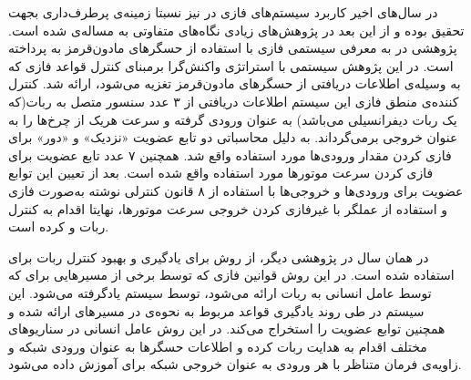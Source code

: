 در سال‌های اخیر کاربرد سیستم‌های فازی در  نیز نسبتا زمینه‌ی پرطرف‌داری بجهت تحقیق بوده و از این بعد در پژوهش‌های زیادی نگاه‌های متفاوتی به مساله‌ی  شده است. پژوهشی در  به معرفی سیستمی فازی با استفاده از حسگرهای مادون‌قرمز به  پرداخته است. در این پژوهش سیستمی با استراتژی واکنش‌گرا برمبنای کنترل قواعد فازی که به وسیله‌ی اطلاعات دریافتی از حسگرهای مادون‌قرمز تغزیه می‌شود، ارائه شد. کنترل کننده‌ی منطق فازی این سیستم اطلاعات دریافتی از ۳ عدد سنسور متصل به ربات(که یک ربات دیفرانسیلی می‌باشد) به عنوان ورودی گرفته و سرعت هریک از چرخ‌ها را به عنوان خروجی برمی‌گرداند. به دلیل محاسباتی دو تابع عضویت «نزدیک» و «دور» برای فازی کردن مقدار ورودی‌ها مورد استفاده واقع شد. همچنین ۷ عدد تابع عضویت برای فازی کردن سرعت موتورها مورد استفاده واقع شده است. بعد از تعیین این توابع عضویت برای ورودی‌ها و خروجی‌ها با استفاده از ۸ قانون کنترلی نوشته به‌صورت فازی و استفاده از عملگر  با غیرفازی کردن خروجی سرعت موتورها، نهایتا اقدام به کنترل ربات و  کرده است.

در همان سال در پژوهشی دیگر، از روش  برای یادگیری و بهبود کنترل ربات برای  استفاده شده است. در این روش قوانین فازی که توسط برخی از مسیرهایی برای  که توسط عامل انسانی به ربات ارائه می‌شود، توسط سیستم  یادگرفته می‌شود. این سیستم در طی روند یادگیری قواعد مربوط به نحوه‌ی  در مسیرهای ارائه شده و همچنین توابع عضویت را استخراج می‌کند. در این روش عامل انسانی در سناریو‌های مختلف اقدام به هدایت ربات کرده و اطلاعات حسگرها به عنوان ورودی شبکه و زاویه‌ی فرمان متناظر با هر ورودی به عنوان خروجی شبکه برای آموزش داده می‌شود.


